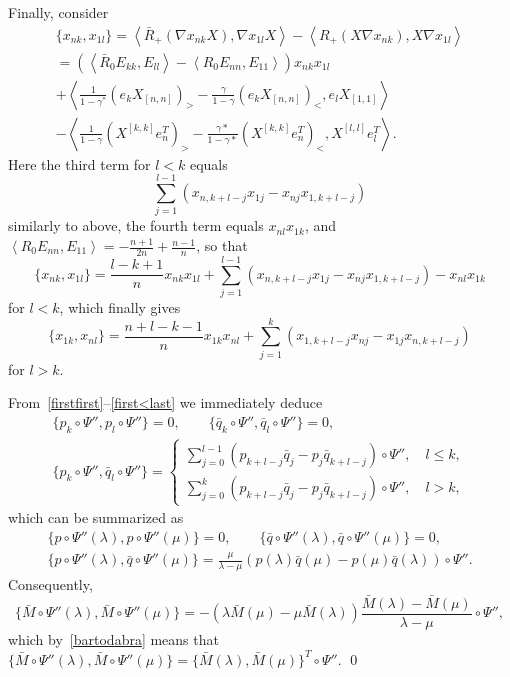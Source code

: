 \documentclass{amsart}
\theoremstyle{definition}
\theoremstyle{remark}
\numberwithin{equation}{section}
\numberwithin{theorem}{section}
\begin{document}
Finally, consider
\begin{multline*}
 \{x_{nk},x_{1l}\}=\left\langle \bar R_+(\nabla x_{nk}X),\nabla x_{1l}X\right\rangle-
\left\langle R_+(X\nabla x_{nk}),X\nabla x_{1l}\right\rangle\\=
\left(\left\langle\bar R_0 E_{kk},E_{ll}\right\rangle
-\left\langle R_0 E_{nn},E_{11}\right\rangle\right) x_{nk}x_{1l}\\+
\left\langle \frac1{1-\gamma^*} (e_kX_{[n,n]})_>-\frac{\gamma}{1-\gamma}(e_kX_{[n,n]})_<,e_lX_{[1,1]}\right\rangle\\-
\left\langle \frac1{1-\gamma} (X^{[k,k]}e_n^T)_>-\frac{\gamma*}{1-\gamma*}(X^{[k,k]}e_n^T)_<,X^{[l,l]}e_l^T\right\rangle.
\end{multline*}
Here the third term for $l<k$ equals
\[
\sum_{j=1}^{l-1}(x_{n,k+l-j}x_{1j}-x_{nj}x_{1,k+l-j})
\]
similarly to above, the fourth term equals $x_{nl}x_{1k}$, and 
 $\left\langle R_0 E_{nn},E_{11}\right\rangle=-\frac{n+1}{2n}+\frac{n-1}n$, so that
\[
\{x_{nk},x_{1l}\}=\frac{l-k+1}nx_{nk}x_{1l}+\sum_{j=1}^{l-1}(x_{n,k+l-j}x_{1j}-x_{nj}x_{1,k+l-j})-x_{nl}x_{1k}
\]
for $l<k$, which finally gives
\begin{equation}\label{first<last}
 \{x_{1k},x_{nl}\}=\frac{n+l-k-1}nx_{1k}x_{nl}+\sum_{j=1}^{k}(x_{1,k+l-j}x_{nj}-x_{1j}x_{n,k+l-j})
\end{equation}
for $l> k$.

From~\eqref{firstfirst}--\eqref{first<last} we immediately deduce
\begin{gather*}
\{p_k\circ\Psi'',p_l\circ\Psi''\}=0,\qquad \{\bar q_k\circ\Psi'',\bar q_l\circ\Psi''\}=0,\\
\{p_k\circ\Psi'',\bar q_l\circ\Psi''\}=
\begin{cases}
\sum\limits_{j=0}^{l-1}(p_{k+l-j}\bar q_j-p_j\bar q_{k+l-j})\circ\Psi'',\quad l\le k,\\
\sum\limits_{j=0}^k(p_{k+l-j}\bar q_j-p_j\bar q_{k+l-j})\circ\Psi'',\quad l>k,
\end{cases}
\end{gather*}
which can be summarized as
\begin{gather*}
\{p\circ\Psi''(\lambda),p\circ\Psi''(\mu)\}=0,\qquad \{\bar q\circ\Psi''(\lambda),\bar q\circ\Psi''(\mu)\}=0,\\
\{p\circ\Psi''(\lambda),\bar q\circ\Psi''(\mu)\}=\frac\mu{\lambda-\mu}
\left(p(\lambda)\bar q(\mu)-p(\mu)\bar q(\lambda)\right)\circ\Psi''.
\end{gather*}
Consequently,
\[
\{\bar M\circ\Psi''(\lambda),\bar M\circ\Psi''(\mu)\}=-\left(\lambda\bar M(\mu)-\mu\bar M(\lambda)\right)
\frac{\bar M(\lambda)-\bar M(\mu)}{\lambda-\mu}\circ\Psi'',
\]
which by~\eqref{bartodabra} means that $\{\bar M\circ\Psi''(\lambda),\bar M\circ\Psi''(\mu)\}=\{\bar M(\lambda),\bar M(\mu)\}^T\circ\Psi''$. \qed
\end{document}
